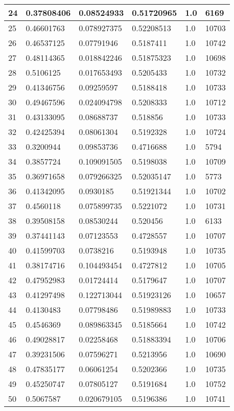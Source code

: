 \begin{longtable}{|l|l|l|l|l|l|}
24 & 0.37808406 & 0.08524933 & 0.51720965 & 1.0 & 6169 \\ \hline 
25 & 0.46601763 & 0.078927375 & 0.52208513 & 1.0 & 10703 \\ \hline 
26 & 0.46537125 & 0.07791946 & 0.5187411 & 1.0 & 10742 \\ \hline 
27 & 0.48114365 & 0.018842246 & 0.51875323 & 1.0 & 10698 \\ \hline 
28 & 0.5106125 & 0.017653493 & 0.5205433 & 1.0 & 10732 \\ \hline 
29 & 0.41346756 & 0.09259597 & 0.5188418 & 1.0 & 10733 \\ \hline 
30 & 0.49467596 & 0.024094798 & 0.5208333 & 1.0 & 10712 \\ \hline 
31 & 0.43133095 & 0.08688737 & 0.518856 & 1.0 & 10733 \\ \hline 
32 & 0.42425394 & 0.08061304 & 0.5192328 & 1.0 & 10724 \\ \hline 
33 & 0.3200944 & 0.09853736 & 0.4716688 & 1.0 & 5794 \\ \hline 
34 & 0.3857724 & 0.109091505 & 0.5198038 & 1.0 & 10709 \\ \hline 
35 & 0.36971658 & 0.079266325 & 0.52035147 & 1.0 & 5773 \\ \hline 
36 & 0.41342095 & 0.0930185 & 0.51921344 & 1.0 & 10702 \\ \hline 
37 & 0.4560118 & 0.075899735 & 0.5221072 & 1.0 & 10731 \\ \hline 
38 & 0.39508158 & 0.08530244 & 0.520456 & 1.0 & 6133 \\ \hline 
39 & 0.37441143 & 0.07123553 & 0.4728557 & 1.0 & 10707 \\ \hline 
40 & 0.41599703 & 0.0738216 & 0.5193948 & 1.0 & 10735 \\ \hline 
41 & 0.38174716 & 0.104493454 & 0.4727812 & 1.0 & 10705 \\ \hline 
42 & 0.47952983 & 0.01724414 & 0.5179647 & 1.0 & 10707 \\ \hline 
43 & 0.41297498 & 0.122713044 & 0.51923126 & 1.0 & 10657 \\ \hline 
44 & 0.4130483 & 0.07798486 & 0.51989883 & 1.0 & 10733 \\ \hline 
45 & 0.4546369 & 0.089863345 & 0.5185664 & 1.0 & 10742 \\ \hline 
46 & 0.49028817 & 0.02258468 & 0.51883394 & 1.0 & 10706 \\ \hline 
47 & 0.39231506 & 0.07596271 & 0.5213956 & 1.0 & 10690 \\ \hline 
48 & 0.47835177 & 0.06061254 & 0.5202366 & 1.0 & 10735 \\ \hline 
49 & 0.45250747 & 0.07805127 & 0.5191684 & 1.0 & 10752 \\ \hline 
50 & 0.5067587 & 0.020679105 & 0.5196386 & 1.0 & 10741 \\ \hline 
\end{longtable}